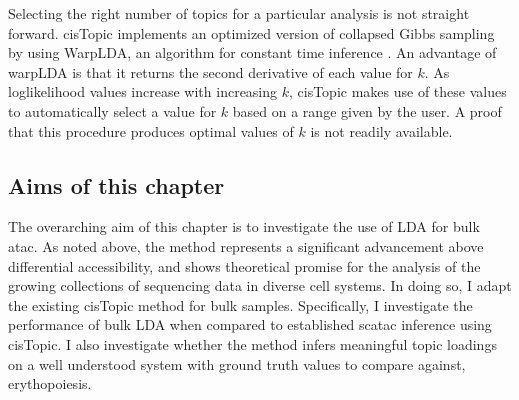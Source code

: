 Selecting the right number of topics for a particular analysis is not straight forward. cisTopic implements an optimized version of collapsed Gibbs sampling by using WarpLDA, an algorithm for constant time inference \cite{Chen2016a}. An advantage of warpLDA is that it returns the second derivative of each value for $k$. As loglikelihood values increase with increasing $k$, cisTopic makes use of these values to automatically select a value for $k$ based on a range given by the user. A proof that this procedure produces optimal values of $k$ is not readily available. 

\subsection{Aims of this chapter}

The overarching aim of this chapter is to investigate the use of LDA for bulk \gls{atac}. As noted above, the method represents a significant advancement above differential accessibility, and shows theoretical promise for the analysis of the growing collections of sequencing data in diverse cell systems. In doing so, I adapt the existing cisTopic method for bulk samples. Specifically, I investigate the performance of bulk LDA when compared to established \gls{scatac} inference using cisTopic. I also investigate whether the method infers meaningful topic loadings on a well understood system with ground truth values to compare against, erythopoiesis.   



